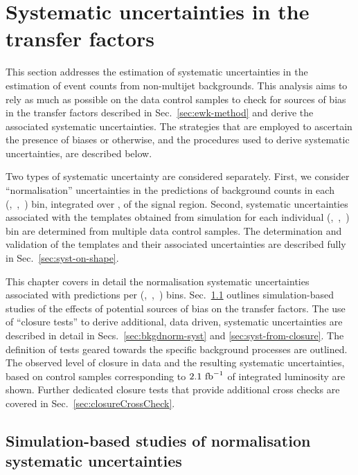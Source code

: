 \section{Systematic uncertainties in the transfer factors}
\label{sec:systematics}

This section addresses the estimation of systematic uncertainties in
the estimation of event counts from non-multijet backgrounds. This
analysis aims to rely as much as possible on the data control samples
to check for sources of bias in the transfer factors described in
Sec.~\ref{sec:ewk-method} and derive the associated systematic
uncertainties. The strategies that are employed to ascertain the
presence of biases or otherwise, and the procedures used to derive
systematic uncertainties, are described below.

Two types of systematic uncertainty are considered separately. First,
we consider ``normalisation'' uncertainties in the predictions of
background counts in each (\njet,~\nb,~\scalht) bin, integrated over
\mht, of the signal region. Second, systematic uncertainties
associated with the \mht templates obtained from simulation for each
individual (\njet,~\nb,~\scalht) bin are determined from multiple data
control samples. The determination and validation of the \mht
templates and their associated uncertainties are described fully in
Sec.~\ref{sec:syst-on-shape}.

This chapter covers in detail the normalisation systematic
uncertainties associated with predictions per (\njet,~\nb,~\scalht)
bins. Sec.~\ref{sec:mc-systematics} outlines simulation-based studies of the
effects of potential sources of bias on the transfer factors.
The use of ``closure tests'' to derive additional, data driven, systematic
uncertainties are described in detail in Secs.~\ref{sec:bkgdnorm-syst}
and \ref{sec:syst-from-closure}. The definition of tests geared
towards the specific background processes are outlined. The observed level 
of closure in data
and the resulting systematic uncertainties, based on control samples
corresponding to $2.1~\ifb$ of integrated luminosity are shown.
Further dedicated closure tests that
provide additional cross checks are covered in
Sec.~\ref{sec:closureCrossCheck}. 


\subsection{Simulation-based studies of normalisation systematic uncertainties}
\label{sec:mc-systematics}


